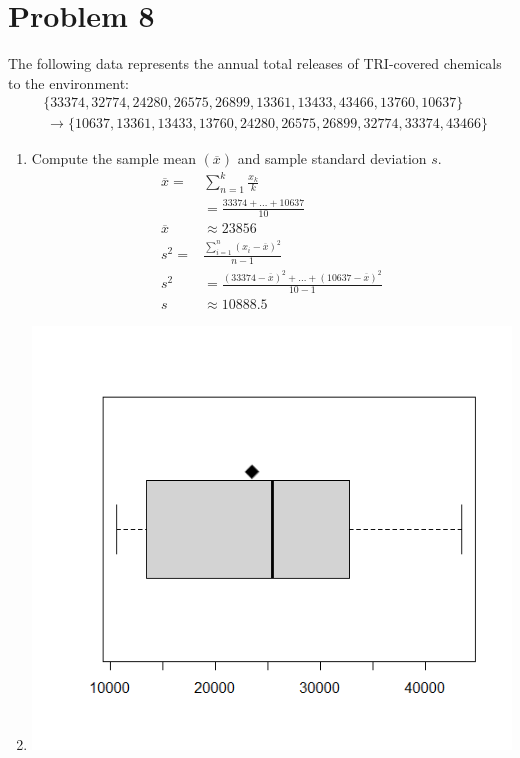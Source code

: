 \documentclass{article}
\begin{document}
\pagebreak

\section*{Problem 8}
The following data represents the annual total releases of TRI-covered chemicals to the environment:
\begin{align*}
     & \{33374, 32774, 24280, 26575, 26899, 13361, 13433, 43466, 13760, 10637\}               \\
     & \ \rightarrow \{ 10637, 13361, 13433, 13760, 24280, 26575, 26899, 32774,33374, 43466\}
\end{align*}

\begin{enumerate}[label=\alph*)]
    \item Compute the sample mean \((\overline{x})\) and sample standard deviation \(s\).
          \begin{align*}
              \overline{x} =                   & \sum_{n=1}^{k}     {\frac{x_k}{k}}                                         \\
                                               & = \frac{33374 + \dots + 10637}{10}                                         \\
              \overline{x}                     & \approx 23856                                                              \\
              s^2                            = & \frac{\sum_{i=1}^{n}(x_i-\overline{x})^2}{n-1}                             \\
              s^2                              & = \frac{(33374 - \overline{x})^2 + \dots + (10637 - \overline{x})^2}{10-1} \\
              s                                & \approx 10888.5
          \end{align*}
    \item \includegraphics[scale=0.5]{boxplot.png}

\end{enumerate}
\end{document}
